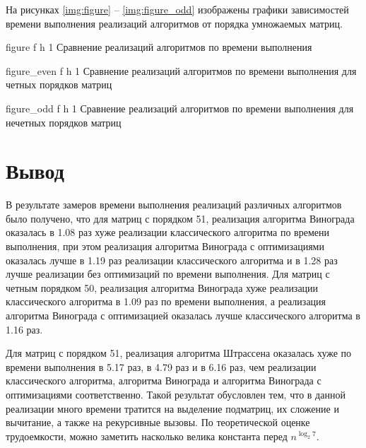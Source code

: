 \clearpage
На рисунках \ref{img:figure} -- \ref{img:figure_odd} изображены графики зависимостей времени выполнения реализаций алгоритмов от порядка умножаемых матриц.

{figure} %
{f} %
{h} %
{1\textwidth} %
{Сравнение реализаций алгоритмов по времени выполнения} %

{figure_even} %
{f} %
{h} %
{1\textwidth} %
{Сравнение реализаций алгоритмов по времени выполнения для четных порядков матриц} %

{figure_odd} %
{f} %
{h} %
{1\textwidth} %
{Сравнение реализаций алгоритмов по времени выполнения для нечетных порядков матриц} %


\clearpage

\section*{Вывод}

В результате замеров времени выполнения реализаций различных алгоритмов было получено, что для матриц с порядком 51, реализация алгоритма Винограда оказалась в 1.08 раз хуже реализации классического алгоритма по времени выполнения, при этом реализация алгоритма Винограда с оптимизациями оказалась лучше в 1.19 раз реализации классического алгоритма и в 1.28 раз лучше реализации без оптимизаций по времени выполнения. 
Для матриц с четным порядком 50, реализация алгоритма Винограда хуже реализации классического алгоритма в 1.09 раз по времени выполнения, а реализация алгоритма Винограда с оптимизацией оказалась лучше классического алгоритма в 1.16 раз. 

Для матриц с порядком 51, реализация алгоритма Штрассена оказалась хуже по времени выполнения в 5.17 раз, в 4.79 раз и в 6.16 раз, чем реализации классического алгоритма, алгоритма Винограда и алгоритма Винограда с оптимизациями соответственно. 
Такой результат обусловлен тем, что в данной реализации много времени тратится на выделение подматриц, их сложение и вычитание, а также на рекурсивные вызовы.
По теоретической оценке трудоемкости, можно заметить насколько велика константа перед $n^{\log_{2}7}$.

